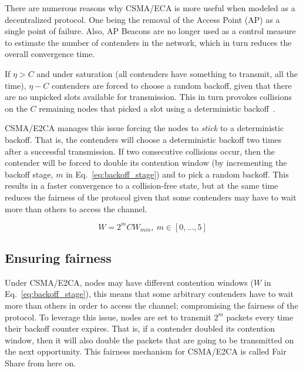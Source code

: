 There are numerous reasons why CSMA/ECA is more useful when modeled as a decentralized protocol. One being the removal of the Access Point (AP) as a single point of failure. Also, AP Beacons are no longer used as a control measure to estimate the number of contenders in the network, which in turn reduces the overall convergence time.


If $\eta > C$ and under saturation (all contenders have something to transmit, all the time), $\eta - C$ contenders are forced to choose a random backoff, given that there are no unpicked slots available for transmission. This in turn provokes collisions on the $C$ remaining nodes that picked a slot using a deterministic backoff~\cite{CSMA_ECA}. 

CSMA/E2CA manages this issue forcing the nodes to \emph{stick} to a deterministic backoff. That is, the contenders will choose a deterministic backoff two times after a successful transmission. If two consecutive collisions occur, then the contender will be forced to double its contention window (by incrementing the backoff stage, $m$ in Eq.~\ref{eq:backoff_stage}) and to pick a random backoff. This results in a faster convergence to a collision-free state, but at the same time reduces the fairness of the protocol given that some contenders may have to wait more than others to access the channel.

\begin{equation} \label{eq:backoff_stage}
	W = 2^{m}CW_{min},\ m\in[0,...,5]
\end{equation}

\subsection{Ensuring fairness}
Under CSMA/E2CA, nodes may have different contention windows ($W$ in Eq.~\ref{eq:backoff_stage}), this means that some arbitrary contenders have to wait more than others in order to access the channel; compromising the fairness of the protocol. To leverage this issue, nodes are set to transmit $2^{m}$ packets every time their backoff counter expires. That is, if a contender doubled its contention window, then it will also double the packets that are going to be transmitted on the next opportunity. This fairness mechanism for CSMA/E2CA is called Fair Share from here on.

